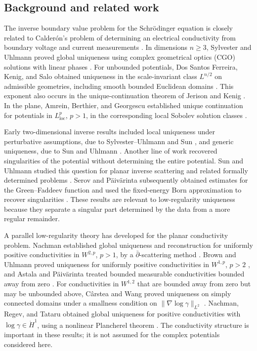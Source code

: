 \documentclass[a4paper,11pt]{article}
\theoremstyle{plain}
\theoremstyle{definition}
\theoremstyle{remark}
\begin{document}
\subsection{Background and related work}

The inverse boundary value problem for the Schr\"odinger equation is closely related to Calder\'on's problem of determining an electrical conductivity from boundary voltage and current measurements \cite{Calderon1980}. In dimensions $n\geq3$, Sylvester and Uhlmann proved global uniqueness using complex geometrical optics (CGO) solutions with linear phases \cite{SylvesterUhlmann1987}. For unbounded potentials, Dos Santos Ferreira, Kenig, and Salo obtained uniqueness in the scale-invariant class $L^{n/2}$ on admissible geometries, including smooth bounded Euclidean domains \cite{DosSantosFerreiraKenigSalo2013}. This exponent also occurs in the unique-continuation theorem of Jerison and Kenig \cite{JerisonKenig1985}. In the plane, Amrein, Berthier, and Georgescu established unique continuation for potentials in $L^p_{\mathrm{loc}}$, $p>1$, in the corresponding local Sobolev solution classes \cite{AmreinBerthierGeorgescu1981}.

Early two-dimensional inverse results included local uniqueness under perturbative assumptions, due to Sylvester--Uhlmann and Sun \cite{SylvesterUhlmann1986,Sun1989,Sun1990}, and generic uniqueness, due to Sun and Uhlmann \cite{SunUhlmann1991}. Another line of work recovered singularities of the potential without determining the entire potential. Sun and Uhlmann studied this question for planar inverse scattering and related formally determined problems \cite{SunUhlmann1993Scattering,SunUhlmann1993Singularities}. Serov and P\"aiv\"arinta subsequently obtained estimates for the Green--Faddeev function and used the fixed-energy Born approximation to recover singularities \cite{SerovPaivarinta2005}. These results are relevant to low-regularity uniqueness because they separate a singular part determined by the data from a more regular remainder.

A parallel low-regularity theory has developed for the planar conductivity problem. Nachman established global uniqueness and reconstruction for uniformly positive conductivities in $W^{2,p}$, $p>1$, by a $\bar\partial$-scattering method \cite{Nachman1996}. Brown and Uhlmann proved uniqueness for uniformly positive conductivities in $W^{1,p}$, $p>2$ \cite{BrownUhlmann1997}, and Astala and P\"aiv\"arinta treated bounded measurable conductivities bounded away from zero \cite{AstalaPaivarinta2006}. For conductivities in $W^{1,2}$ that are bounded away from zero but may be unbounded above, C\^arstea and Wang proved uniqueness on simply connected domains under a smallness condition on $\|\nabla\log\gamma\|_{L^2}$ \cite{CarsteaWang2018}. Nachman, Regev, and Tataru obtained global uniqueness for positive conductivities with $\log\gamma\in\dot H^1$, using a nonlinear Plancherel theorem \cite{NachmanRegevTataru2020}. The conductivity structure is important in these results; it is not assumed for the complex potentials considered here.
\end{document}
